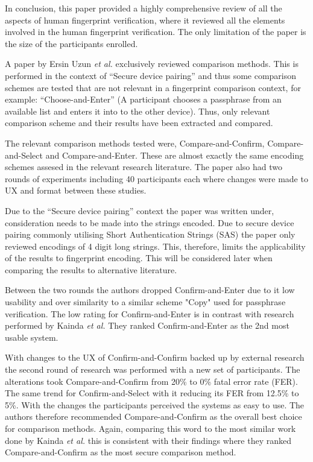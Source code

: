In conclusion, this paper provided a highly comprehensive review of all the aspects of human fingerprint verification, where it reviewed all the elements involved in the human fingerprint verification. The only limitation of the paper is the size of the participants enrolled.

A paper by Ersin Uzun \textit{et al.} exclusively reviewed comparison methods. This is performed in the context of ``Secure device pairing'' and thus some comparison schemes are tested that are not relevant in a fingerprint comparison context, for example:  ``Choose-and-Enter'' (A participant chooses a passphrase from an available list and enters it into to the other device). Thus, only relevant comparison scheme and their results have been extracted and compared. 

The relevant comparison methods tested were, Compare-and-Confirm, Compare-and-Select and Compare-and-Enter. These are almost exactly the same encoding schemes assesed in the relevant research literature. The paper also had two rounds of experiments including 40 participants each where changes were made to UX and format between these studies.

Due to the ``Secure device pairing'' context the paper was written under, consideration needs to be made into the strings encoded. Due to secure device pairing commonly utilising Short Authentication Strings (SAS) the paper only reviewed encodings of 4 digit long strings. This, therefore, limits the applicability of the results to fingerprint encoding. This will be considered later when comparing the results to alternative literature.

Between the two rounds the authors dropped Confirm-and-Enter due to it low usability and over similarity to a similar scheme "Copy" used for passphrase verification. The low rating for Confirm-and-Enter is in contrast with research performed by Kainda \textit{et al.}\cite{kainda2009usability} They ranked Confirm-and-Enter as the 2nd most usable system.

With changes to the UX of Confirm-and-Confirm backed up by external research \cite{palmer1990attentional}\cite{hammer2009category} the second round of research was performed with a new set of participants. The alterations took Compare-and-Confirm from 20\% to 0\% fatal error rate (FER). The same trend for Confirm-and-Select with it reducing its FER from 12.5\% to 5\%. With the changes the participants perceived the systems as easy to use. The authors therefore recommended Compare-and-Confirm as the overall best choice for comparison methods. Again, comparing this word to the most similar work done by Kainda \textit{et al.}\cite{kainda2009usability} this is consistent with their findings where they ranked Compare-and-Confirm as the most secure comparison method.

